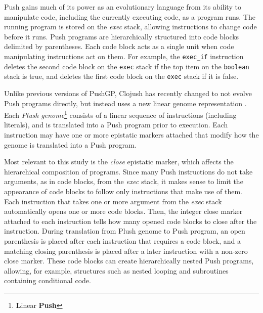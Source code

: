 Push gains much of its power as an evolutionary language from its ability to manipulate code, including the currently executing code, as a program runs. The running program is stored on the \textit{exec} stack, allowing instructions to change code before it runs. Push programs are hierarchically structured into code blocks delimited by parentheses. Each code block acts as a single unit when code manipulating instructions act on them. For example, the \texttt{exec\_if} instruction deletes the second code block on the \texttt{exec} stack if the top item on the \texttt{boolean} stack is true, and deletes the first code block on the \texttt{exec} stack if it is false.

Unlike previous versions of PushGP, Clojush has recently changed to not evolve Push programs directly, but instead uses a new linear genome representation \citep{Helmuth:2016:GPTP}. Each \textit{Plush genome}\footnote{\textbf{L}inear \textbf{Push}} consists of a linear sequence of instructions (including literals), and is translated into a Push program prior to execution. Each instruction may have one or more epistatic markers attached that modify how the genome is translated into a Push program.

Most relevant to this study is the \textit{close} epistatic marker, which affects the hierarchical composition of programs. Since many Push instructions do not take arguments, as in code blocks, from the \textit{exec} stack, it makes sense to limit the appearance of code blocks to follow only instructions that make use of them. Each instruction that takes one or more argument from the \textit{exec} stack automatically opens one or more code blocks. Then, the integer close marker attached to each instruction tells how many opened code blocks to close after the instruction. During translation from Plush genome to Push program, an open parenthesis is placed after each instruction that requires a code block, and a matching closing parenthesis is placed after a later instruction with a non-zero close marker. These code blocks can create hierarchically nested Push programs, allowing, for example, structures such as nested looping and subroutines containing conditional code.

